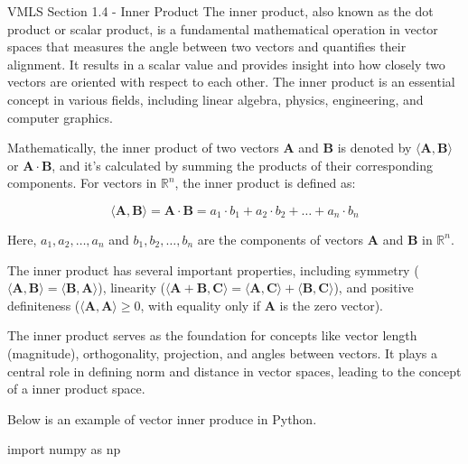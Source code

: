 \begin{notes}{VMLS Section 1.4 - Inner Product}
    The inner product, also known as the dot product or scalar product, is a fundamental mathematical operation in vector spaces that measures the angle between two vectors and quantifies their alignment. It results in a 
    scalar value and provides insight into how closely two vectors are oriented with respect to each other. The inner product is an essential concept in various fields, including linear algebra, physics, engineering, and 
    computer graphics.

    \begin{highlight}
        Mathematically, the inner product of two vectors \(\mathbf{A}\) and \(\mathbf{B}\) is denoted by \(\langle \mathbf{A}, \mathbf{B} \rangle\) or \(\mathbf{A} \cdot \mathbf{B}\), and it's calculated by summing the 
        products of their corresponding components. For vectors in \(\mathbb{R}^n\), the inner product is defined as:

        \[
        \langle \mathbf{A}, \mathbf{B} \rangle = \mathbf{A} \cdot \mathbf{B} = a_1 \cdot b_1 + a_2 \cdot b_2 + \ldots + a_n \cdot b_n
        \]
    
        Here, \(a_1, a_2, \ldots, a_n\) and \(b_1, b_2, \ldots, b_n\) are the components of vectors \(\mathbf{A}\) and \(\mathbf{B}\) in \(\mathbb{R}^n\).
    \end{highlight}

    The inner product has several important properties, including symmetry (\(\langle \mathbf{A}, \mathbf{B} \rangle = \langle \mathbf{B}, \mathbf{A} \rangle\)), linearity (\(\langle \mathbf{A} + \mathbf{B}, \mathbf{C} 
    \rangle = \langle \mathbf{A}, \mathbf{C} \rangle + \langle \mathbf{B}, \mathbf{C} \rangle\)), and positive definiteness (\(\langle \mathbf{A}, \mathbf{A} \rangle \geq 0\), with equality only if \(\mathbf{A}\) is 
    the zero vector).

    The inner product serves as the foundation for concepts like vector length (magnitude), orthogonality, projection, and angles between vectors. It plays a central role in defining norm and distance in vector spaces, 
    leading to the concept of a inner product space.

    \begin{highlight}
        Below is an example of vector inner produce in Python.

    \begin{code}[Python]
    import numpy as np


\end{code}
\end{highlight}
\end{notes}
